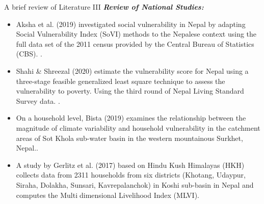 \documentclass{beamer}
\newcommand{\coloredcite}[2]{\textcolor{blue}{\cite{#2}}}
\begin{document}
	\begin{frame}[t]{A brief review of Literature III }
		\textbf{\textit{Review of National Studies:}}
		\begin{itemize}
			\item \begin{justify} \small Aksha et al. (2019) investigated social vulnerability in Nepal by adapting Social Vulnerability Index (SoVI) methods to the Nepalese context using the full data set of the 2011 census provided by the Central Bureau of Statistics (CBS). \small\coloredcite{}{r29}.
			\end{justify}
			\item \begin{justify} \small Shahi & Shreezal (2020) estimate the vulnerability score for Nepal using a three-stage feasible generalized least square technique to assess the vulnerability to poverty. Using the third round of Nepal Living Standard Survey data. \small\coloredcite{}{r26}.\end{justify}
			
			\item \small On a household level, Bista (2019) examines the relationship between the magnitude of climate variability and household vulnerability in the catchment areas of Sot Khola sub-water basin in the western mountainous Surkhet, Nepal.\small\coloredcite{}{r31}.
			
			\item \small A study by Gerlitz et al. (2017) based on Hindu Kush Himalayas (HKH) collects data from 2311 households from six districts (Khotang, Udaypur, Siraha, Dolakha, Sunsari, Kavrepalanchok) in Koshi sub-basin in Nepal and computes the Multidimensional Livelihood Index (MLVI). \small\coloredcite{}{r32}
		\end{itemize}
	\end{frame}
	
	
\end{document}
